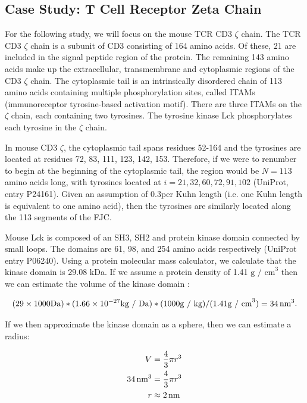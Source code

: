 \documentclass[../AdvancementSummary.tex]{subfiles}
\begin{document}
\subsection{Case Study: T Cell Receptor Zeta Chain}
\label{sec:ModelDevsubsec:TCR}
For the following study, we will focus on the mouse TCR CD3 $\zeta$ chain. The TCR CD3 $\zeta$ chain is a subunit of CD3 consisting of 164 amino acids. Of these, 21 are included in the signal peptide region of the protein. The remaining 143 amino acids make up the extracellular, transmembrane and cytoplasmic regions of the CD3 $\zeta$ chain. The cytoplasmic tail is an intrinsically disordered chain of 113 amino acids containing multiple phosphorylation sites, called ITAMs (immunoreceptor tyrosine-based activation motif). There are three ITAMs on the $\zeta$ chain, each containing two tyrosines. The tyrosine kinase Lck phosphorylates each tyrosine in the $\zeta$ chain. 

In mouse CD3 $\zeta$, the cytoplasmic tail spans residues 52-164 and the tyrosines are located at residues 72, 83, 111, 123, 142, 153. Therefore, if we were to renumber to begin at the beginning of the cytoplasmic tail, the region would be $N=113$ amino acids long, with tyrosines located at $i= 21, 32, 60, 72, 91, 102$ (UniProt, entry P24161). Given an assumption of 0.3\nm per Kuhn length (i.e. one Kuhn length is equivalent to one amino acid), then the tyrosines are similarly located along the 113 segments of the FJC.

Mouse Lck is composed of an SH3, SH2 and protein kinase domain connected by small loops. The domains are 61, 98, and 254 amino acids respectively (UniProt entry P06240). Using a protein molecular mass calculator, %
we calculate that the kinase domain is 29.08 kDa. If we assume a protein density of 1.41 $\mbox{g / cm}^3$ then we can estimate the volume of the kinase domain \cite{Fischer2004}:

\begin{equation*}
(29 \times 1000 \mbox{Da}) * (1.66\times10^{-27} \mbox{kg / Da}) * (1000 \mbox{g / kg}) / (1.41 \mbox{g / cm}^3) = 34 \,\mbox{nm}^3.
\end{equation*}

If we then approximate the kinase domain as a sphere, then we can estimate a radius: 

\begin{align*}
V &= \frac{4}{3}\pi r^3 \\
34 \,\mbox{nm}^3 &= \frac{4}{3} \pi r^3 \\
r &\approx 2 \,\mbox{nm} \\
\end{align*}
%
\end{document}
